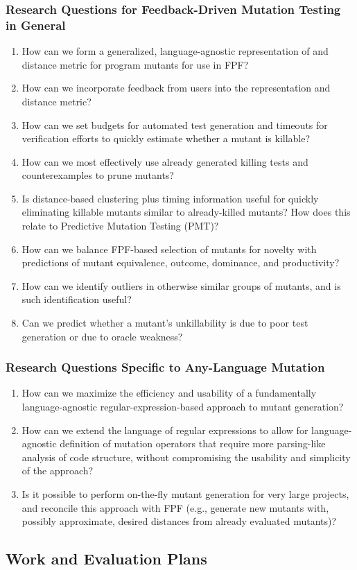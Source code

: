 \subsubsection{Research Questions for Feedback-Driven Mutation Testing
in General}

\begin{enumerate}
\item How can we form a generalized, language-agnostic representation
  of and distance metric for program mutants for use in FPF?
\item How can we incorporate feedback from users into the
  representation and distance metric?
\item How can we set budgets for automated test generation and
  timeouts for verification efforts to quickly estimate whether a
  mutant is killable?
\item How can we most effectively use already generated killing tests
  and counterexamples to prune mutants?
\item Is distance-based clustering plus timing information useful for quickly
  eliminating killable mutants similar to already-killed mutants?  How
  does this relate to Predictive Mutation Testing (PMT)?
\item How can we balance FPF-based selection of mutants for novelty
  with predictions of mutant equivalence, outcome, dominance, and
  productivity?
\item How can we identify outliers in otherwise similar groups of
  mutants, and is such identification useful?
\item Can we predict whether a mutant's unkillability is due to poor test
  generation  or due to oracle weakness?
\end{enumerate}

\subsubsection{Research Questions Specific to Any-Language Mutation}

\begin{enumerate}
\item How can we maximize the efficiency and usability of a
  fundamentally language-agnostic regular-expression-based approach to
  mutant generation?
\item How can we extend the language of regular expressions to allow
  for language-agnostic definition of mutation operators that require
  more parsing-like analysis of code structure, without compromising
  the usability and simplicity of the approach?
\item Is it possible to perform on-the-fly mutant generation for very
  large projects, and reconcile this approach with FPF (e.g., generate
  new mutants with, possibly approximate, desired distances from
  already evaluated mutants)?
\end{enumerate}

\subsection{Work and Evaluation Plans}
\label{sec:workplan}

